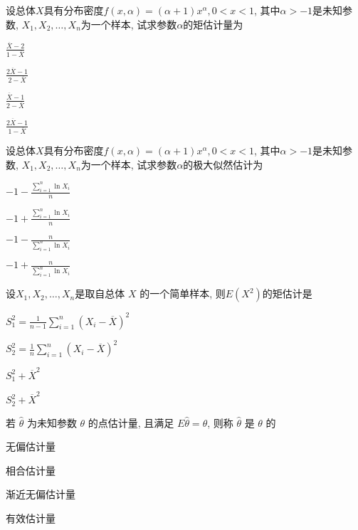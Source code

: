 \documentclass{exam-zh}
\begin{document}
\begin{question}
  设总体$X$具有分布密度$f(x, \alpha) = (\alpha + 1)x^{\alpha}, 0<x<1$, 其中$\alpha>-1$是未知参数, $X_1, X_2, \dots, X_n$为一个样本, 试求参数$\alpha$的矩估计量为 \paren[D]
  
  \begin{choices}
        \item $\frac{\overline{X} - 2}{1 - \overline{X}}$
        \item $\frac{2\overline{X} - 1}{2 - \overline{X}}$
        \item $\frac{\overline{X} - 1}{2 - \overline{X}}$
        \item $\frac{2\overline{X} - 1}{1 - \overline{X}}$
  \end{choices}
\end{question}

\begin{question}
  设总体$X$具有分布密度$f(x, \alpha) = (\alpha + 1)x^{\alpha}, 0 < x < 1$, 其中$\alpha>-1$是未知参数, $X_1, X_2, \dots, X_n$为一个样本, 试求参数$\alpha$的极大似然估计为 \paren[C]
  
  \begin{choices}
    \item $-1 - \frac{\sum_{i=1}^{n}\ln X_i}{n}$
    \item $-1 + \frac{\sum_{i=1}^{n}\ln X_i}{n}$
    \item $-1 - \frac{n}{\sum_{i=1}^{n}\ln X_i}$
    \item $-1 + \frac{n}{\sum_{i=1}^{n}\ln X_i}$
  \end{choices}
\end{question}

\begin{question}
  设$X_1, X_2,\dots, X_n$是取自总体 $X$ 的一个简单样本, 则$E(X^2)$的矩估计是 \paren[D]
  
  \begin{choices}
      \item $S_1^2 = \frac{1}{n-1}\sum_{i=1}^{n}(X_i - \overline{X})^2$
      \item $S_2^2 = \frac{1}{n}\sum_{i=1}^{n}(X_i - \overline{X})^2$
      \item $S_1^2 + \overline{X}^2$
      \item $S_2^2 + \overline{X}^2$
  \end{choices}
\end{question}

\begin{question}
  若 $\hat{\theta}$ 为未知参数 $\theta$ 的点估计量, 且满足 $E\hat{\theta} = \theta$, 则称 $\hat{\theta}$ 是 $\theta$ 的 \paren[A]
  
  \begin{choices}
    \item 无偏估计量
    \item 相合估计量
    \item 渐近无偏估计量
    \item 有效估计量
  \end{choices}
\end{question}
\end{document}

